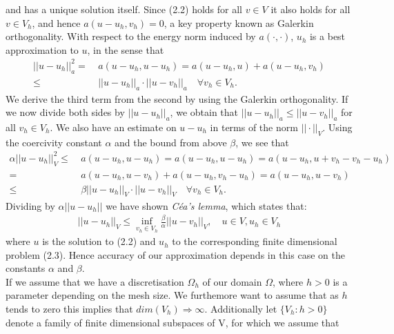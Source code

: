 \documentclass[fleqn, a4paper, 11pt, bibliography=totoc]{report}
\begin{document}
and has a unique solution itself. Since (2.2) holds for all $v \in V$ it also holds for all $v \in V_h$, and hence $a(u-u_h, v_h) = 0$, a key property known as Galerkin orthogonality. With respect to the energy norm induced by $a(\cdot, \cdot)$, $u_h$ is a best approximation to $u$, in the sense that 
\begin{equation}
\begin{aligned}
|| u - u_h ||_a^2 =& \ a(u-u_h, u-u_h) = a(u-u_h, u) + a(u-u_h, v_h) \\
\leq& \ ||u - u_h ||_a \cdot || u - v_h ||_a \quad \forall v_h \in V_h.
\end{aligned}
\end{equation}
We derive the third term from the second by using the Galerkin orthogonality. If we now divide both sides by $|| u - u_h||_a$, we obtain that $|| u - u_h ||_a \leq || u -v_h||_a$ for all $v_h \in V_h$. We also have an estimate on $u - u_h$ in terms of the  norm $|| \cdot ||_V$. Using the coercivity constant $\alpha$ and the bound from above $\beta$, we see that
\begin{equation}
\begin{aligned}
\alpha || u - u_h ||_V^2 \leq& \ a(u-u_h, u-u_h) = a(u-u_h, u- u_h) = a(u-u_h, u +v_h - v_h - u_h ) \\
=& \ a(u-u_h, u - v_h) + a(u - u_h, v_h - u_h) = a(u-u_h, u - v_h) \\
\leq& \ \beta || u - u_h ||_V \cdot || u - v_h||_V  \quad \forall v_h \in V_h.
\end{aligned}
\end{equation}
Dividing by $\alpha || u - u_h || $ we have shown \textit{C\'{e}a's lemma}, which states that:
\begin{equation}
\begin{aligned}
|| u - u_h ||_V \leq \inf_{v_h \in V_h} \frac{\beta}{\alpha} || u - v_h ||_V, \quad u \in V, u_h \in V_h
\end{aligned}
\end{equation}
where $u$ is the solution to (2.2) and $u_h$ to the corresponding finite dimensional problem (2.3). Hence accuracy of our approximation depends in this case on the constants $\alpha$ and $\beta$. 
\bigskip
\\ 
If we assume that we have a discretisation $\Omega_h$ of our domain $\Omega$, where $h > 0$ is a parameter depending on the mesh size.  We furthemore want to assume that as $h$ tends to zero this implies that $dim(V_h) \Rightarrow \infty$. Additionally let $\{V_h : h > 0\}$ denote a family of finite dimensional subspaces of V, for which we assume that
\end{document}
